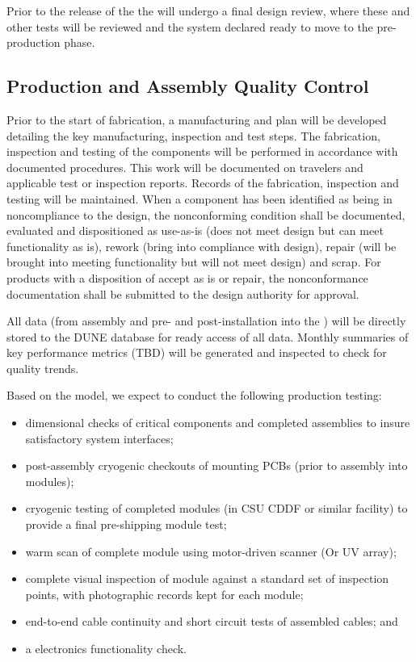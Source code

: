 Prior to the release of the  the  will undergo a final design review, where these and other  tests will be reviewed and the system declared ready to move to the pre-production phase.


\subsection{Production and Assembly Quality Control}
\label{sec:fdsp-pd-prodqc}

Prior to the start of fabrication, a manufacturing and  plan will be developed detailing the key manufacturing, inspection and test steps.  The fabrication, inspection and testing of the components will be performed in accordance with documented procedures. This work will be documented on travelers and applicable test or inspection reports. Records of the fabrication, inspection and testing will be maintained. When a component has been identified as being in noncompliance to the design, the nonconforming condition shall be documented, evaluated and dispositioned as use-as-is (does not meet design but can meet functionality as is), rework (bring into compliance with design), repair (will be brought into meeting functionality but will not meet design) and scrap. For products with a disposition of accept as is or repair, the nonconformance documentation shall be submitted to the design authority for approval.   

All  data  (from assembly and pre- and post-installation into the ) will be directly stored to the DUNE database for ready access of all  data.  Monthly summaries of key performance metrics (TBD) will be generated and inspected to check for quality trends.

Based on the  model, we expect to conduct the following production testing:
\begin{itemize}
\item dimensional checks of critical components and completed assemblies to insure satisfactory system interfaces;
\item post-assembly cryogenic checkouts of  mounting PCBs (prior to assembly into  modules);
\item cryogenic testing of completed modules (in CSU CDDF or similar facility) to provide a final pre-shipping module test;
\item warm scan of complete module using motor-driven  scanner (Or UV   array);
\item complete visual inspection of module against a standard set of inspection points, with photographic records kept for each module;
\item end-to-end cable continuity and short circuit tests of assembled cables; and
\item a  electronics functionality check.
\end{itemize}


